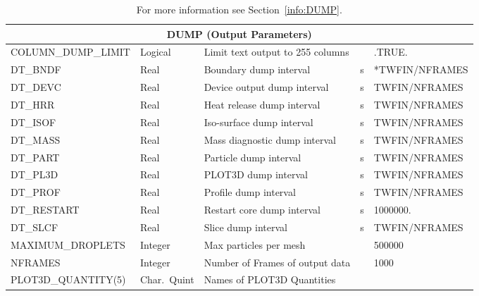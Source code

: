 \documentclass[11pt]{book}
\begin{document}
\begin{table}[H]
\caption{For more information see Section~\ref{info:DUMP}.}\label{tbl:DUMP}
\noindent
\begin{tabular*}{6.5in}{@{\extracolsep{\fill}}|l|l|l|l|l|}
\hline
\multicolumn{5}{|c|}{{\ct DUMP} (Output Parameters)} \\ \hline \hline
{\ct COLUMN\_DUMP\_LIMIT}       & Logical      & Limit text output to 255 columns  &           & {\ct .TRUE.}          \\ \hline
{\ct DT\_BNDF}                  & Real         & Boundary dump interval            &  s        & {\ct 2*TWFIN/NFRAMES} \\ \hline
{\ct DT\_DEVC}                  & Real         & Device output dump interval       &  s        & {\ct TWFIN/NFRAMES}   \\ \hline
{\ct DT\_HRR}                   & Real         & Heat release dump interval        &  s        & {\ct TWFIN/NFRAMES}   \\ \hline
{\ct DT\_ISOF}                  & Real         & Iso-surface dump interval         &  s        & {\ct TWFIN/NFRAMES}   \\ \hline
{\ct DT\_MASS}                  & Real         & Mass diagnostic dump interval     &  s        & {\ct TWFIN/NFRAMES}   \\ \hline
{\ct DT\_PART}                  & Real         & Particle dump interval            &  s        & {\ct TWFIN/NFRAMES}   \\ \hline
{\ct DT\_PL3D}                  & Real         & PLOT3D dump interval              &  s        &{\ct TWFIN/NFRAMES}    \\ \hline
{\ct DT\_PROF}                  & Real         & Profile dump interval             &  s        &{\ct TWFIN/NFRAMES}    \\ \hline
{\ct DT\_RESTART}               & Real         & Restart core dump interval        &  s        & 1000000.              \\ \hline
{\ct DT\_SLCF}                  & Real         & Slice dump interval               &  s        &{\ct TWFIN/NFRAMES}    \\ \hline
{\ct MAXIMUM\_DROPLETS}         & Integer      & Max particles per mesh            &           & 500000                \\ \hline
{\ct NFRAMES}                   & Integer      & Number of Frames of output data   &           & 1000                  \\ \hline
{\ct PLOT3D\_QUANTITY(5)}       & Char.~Quint  & Names of PLOT3D Quantities        &           &                       \\ \hline

\end{tabular*}
\end{table}
\end{document}
